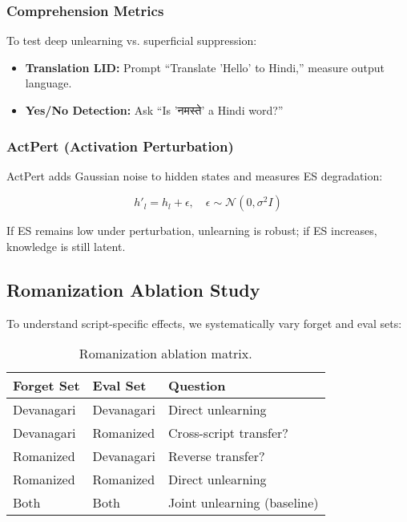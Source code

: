 \documentclass[11pt]{article}
\begin{document}
\subsubsection{Comprehension Metrics}

To test deep unlearning vs. superficial suppression:

\begin{itemize}
    \item \textbf{Translation LID:} Prompt ``Translate 'Hello' to Hindi,'' measure output language.
    \item \textbf{Yes/No Detection:} Ask ``Is 'नमस्ते' a Hindi word?''
\end{itemize}

\subsubsection{ActPert (Activation Perturbation)}

ActPert \cite{actpert2025} adds Gaussian noise to hidden states and measures ES degradation:

\begin{equation}
    h'_l = h_l + \epsilon, \quad \epsilon \sim \mathcal{N}(0, \sigma^2 I)
\end{equation}

If ES remains low under perturbation, unlearning is robust; if ES increases, knowledge is still latent.

\subsection{Romanization Ablation Study}

To understand script-specific effects, we systematically vary forget and eval sets:

\begin{table}[h]
\centering
\small
\begin{tabular}{@{}lll@{}}
\toprule
\textbf{Forget Set} & \textbf{Eval Set} & \textbf{Question} \\
\midrule
Devanagari & Devanagari & Direct unlearning \\
Devanagari & Romanized & Cross-script transfer? \\
Romanized & Devanagari & Reverse transfer? \\
Romanized & Romanized & Direct unlearning \\
Both & Both & Joint unlearning (baseline) \\
\bottomrule
\end{tabular}
\caption{Romanization ablation matrix.}
\label{tab:rom_ablation}
\end{table}
\end{document}
